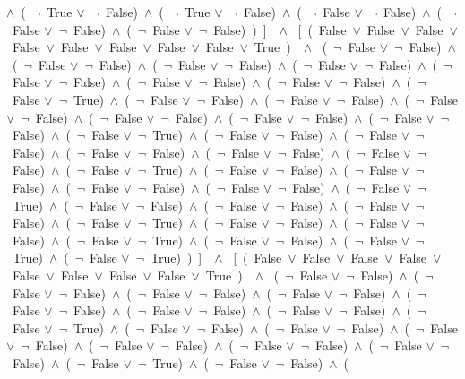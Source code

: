 ﻿\documentclass[a4paper,10pt]{article}
\begin{document}
$\wedge$\ (\  $\neg$\ True $\vee$\  $\neg$\ False)\ $\wedge$\ (\  $\neg$\ True $\vee$\  $\neg$\ False)\ $\wedge$\ (\  $\neg$\ False $\vee$\  $\neg$\ False)\ $\wedge$\ (\  $\neg$\ False $\vee$\  $\neg$\ False)\ $\wedge$\ (\  $\neg$\ False $\vee$\  $\neg$\ False)\ )\ ]\ \ $\wedge$ \ [\ (\ False\ $\vee$\ False\ $\vee$\ False\ $\vee$\ False\ $\vee$\ False\ $\vee$\ False\ $\vee$\ False\ $\vee$\ False\ $\vee$\ True\ )\ \ $\wedge$ \ (\  $\neg$\ False $\vee$\  $\neg$\ False)\ $\wedge$\ (\  $\neg$\ False $\vee$\  $\neg$\ False)\ $\wedge$\ (\  $\neg$\ False $\vee$\  $\neg$\ False)\ $\wedge$\ (\  $\neg$\ False $\vee$\  $\neg$\ False)\ $\wedge$\ (\  $\neg$\ False $\vee$\  $\neg$\ False)\ $\wedge$\ (\  $\neg$\ False $\vee$\  $\neg$\ False)\ $\wedge$\ (\  $\neg$\ False $\vee$\  $\neg$\ False)\ $\wedge$\ (\  $\neg$\ False $\vee$\  $\neg$\ True)\ $\wedge$\ (\  $\neg$\ False $\vee$\  $\neg$\ False)\ $\wedge$\ (\  $\neg$\ False $\vee$\  $\neg$\ False)\ $\wedge$\ (\  $\neg$\ False $\vee$\  $\neg$\ False)\ $\wedge$\ (\  $\neg$\ False $\vee$\  $\neg$\ False)\ $\wedge$\ (\  $\neg$\ False $\vee$\  $\neg$\ False)\ $\wedge$\ (\  $\neg$\ False $\vee$\  $\neg$\ False)\ $\wedge$\ (\  $\neg$\ False $\vee$\  $\neg$\ True)\ $\wedge$\ (\  $\neg$\ False $\vee$\  $\neg$\ False)\ $\wedge$\ (\  $\neg$\ False $\vee$\  $\neg$\ False)\ $\wedge$\ (\  $\neg$\ False $\vee$\  $\neg$\ False)\ $\wedge$\ (\  $\neg$\ False $\vee$\  $\neg$\ False)\ $\wedge$\ (\  $\neg$\ False $\vee$\  $\neg$\ False)\ $\wedge$\ (\  $\neg$\ False $\vee$\  $\neg$\ True)\ $\wedge$\ (\  $\neg$\ False $\vee$\  $\neg$\ False)\ $\wedge$\ (\  $\neg$\ False $\vee$\  $\neg$\ False)\ $\wedge$\ (\  $\neg$\ False $\vee$\  $\neg$\ False)\ $\wedge$\ (\  $\neg$\ False $\vee$\  $\neg$\ False)\ $\wedge$\ (\  $\neg$\ False $\vee$\  $\neg$\ True)\ $\wedge$\ (\  $\neg$\ False $\vee$\  $\neg$\ False)\ $\wedge$\ (\  $\neg$\ False $\vee$\  $\neg$\ False)\ $\wedge$\ (\  $\neg$\ False $\vee$\  $\neg$\ False)\ $\wedge$\ (\  $\neg$\ False $\vee$\  $\neg$\ True)\ $\wedge$\ (\  $\neg$\ False $\vee$\  $\neg$\ False)\ $\wedge$\ (\  $\neg$\ False $\vee$\  $\neg$\ False)\ $\wedge$\ (\  $\neg$\ False $\vee$\  $\neg$\ True)\ $\wedge$\ (\  $\neg$\ False $\vee$\  $\neg$\ False)\ $\wedge$\ (\  $\neg$\ False $\vee$\  $\neg$\ True)\ $\wedge$\ (\  $\neg$\ False $\vee$\  $\neg$\ True)\ )\ ]\ \ $\wedge$ \ [\ (\ False\ $\vee$\ False\ $\vee$\ False\ $\vee$\ False\ $\vee$\ False\ $\vee$\ False\ $\vee$\ False\ $\vee$\ False\ $\vee$\ True\ )\ \ $\wedge$ \ (\  $\neg$\ False $\vee$\  $\neg$\ False)\ $\wedge$\ (\  $\neg$\ False $\vee$\  $\neg$\ False)\ $\wedge$\ (\  $\neg$\ False $\vee$\  $\neg$\ False)\ $\wedge$\ (\  $\neg$\ False $\vee$\  $\neg$\ False)\ $\wedge$\ (\  $\neg$\ False $\vee$\  $\neg$\ False)\ $\wedge$\ (\  $\neg$\ False $\vee$\  $\neg$\ False)\ $\wedge$\ (\  $\neg$\ False $\vee$\  $\neg$\ False)\ $\wedge$\ (\  $\neg$\ False $\vee$\  $\neg$\ True)\ $\wedge$\ (\  $\neg$\ False $\vee$\  $\neg$\ False)\ $\wedge$\ (\  $\neg$\ False $\vee$\  $\neg$\ False)\ $\wedge$\ (\  $\neg$\ False $\vee$\  $\neg$\ False)\ $\wedge$\ (\  $\neg$\ False $\vee$\  $\neg$\ False)\ $\wedge$\ (\  $\neg$\ False $\vee$\  $\neg$\ False)\ $\wedge$\ (\  $\neg$\ False $\vee$\  $\neg$\ False)\ $\wedge$\ (\  $\neg$\ False $\vee$\  $\neg$\ True)\ $\wedge$\ (\  $\neg$\ False $\vee$\  $\neg$\ False)\ $\wedge$\ (\ 
\end{document}
